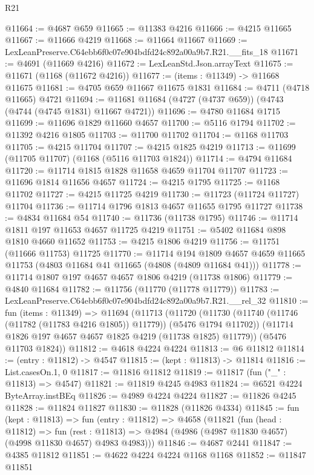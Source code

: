 \begin{lexlean}{R21}
\begin{coremodule}
@11664 := @4687 @659
@11665 := @11383 @4216
@11666 := @4215 @11665
@11667 := @11666 @4219
@11668 := @11664 @11667
@11669 := LexLeanPreserve.C64ebb6f0c07e904bdfd24c892a00a9b7.R21.__fits_18
@11671 := @4691 (@11669 @4216)
@11672 := LexLeanStd.Json.arrayText
@11675 := @11671 (@1168 (@11672 @4216))
@11677 := (items : @11349) -> @11668 @11675
@11681 := @4705 @659 @11667 @11675 @1831
@11684 := @4711 (@4718 @11665) @4721
@11694 := @11681 @11684 (@4727 (@4737 @659)) (@4743 (@4744 (@4745 @1831) @11667 @4721))
@11696 := @4780 @11684 @1715
@11699 := @11696 @1829 @11660 @4657
@11700 := @5116 @1794
@11702 := @11392 @4216 @1805
@11703 := @11700 @11702
@11704 := @1168 @11703
@11705 := @4215 @11704
@11707 := @4215 @1825 @4219
@11713 := @11699 (@11705 @11707) (@1168 (@5116 @11703 @1824))
@11714 := @4794 @11684
@11720 := @11714 @1815 @1828 @11658 @4659 @11704 @11707
@11723 := @11696 @1814 @11656 @4657
@11724 := @4215 @1795
@11725 := @1168 @11702
@11727 := @4215 @11725 @4219
@11730 := @11723 (@11724 @11727) @11704
@11736 := @11714 @1796 @1813 @4657 @11655 @1795 @11727
@11738 := @4834 @11684 @54
@11740 := @11736 (@11738 @1795)
@11746 := @11714 @1811 @197 @11653 @4657 @11725 @4219
@11751 := @5402 @11684 @898 @1810 @4660 @11652
@11753 := @4215 @1806 @4219
@11756 := @11751 (@11666 @11753) @11725
@11770 := @11714
    @194
    @1809
    @4657
    @4659
    @11665
    @11753
    (@4803 @11684 @41 @11665 (@4808 (@4809 @11684 @41)))
@11778 := @11714 @1807 @197 @4657 @4657 @1806 @4219 (@11738 @1806)
@11779 := @4840 @11684
@11782 := @11756 (@11770 (@11778 @11779))
@11783 := LexLeanPreserve.C64ebb6f0c07e904bdfd24c892a00a9b7.R21.__rel_32
@11810 := fun (items : @11349) =>
  @11694
    (@11713
      (@11720
        (@11730 (@11740 (@11746 (@11782 (@11783 @4216 @1805)) @11779)) (@5476 @1794 @11702))
        (@11714 @1826 @197 @4657 @4657 @1825 @4219 (@11738 @1825) @11779))
      (@5476 @11703 @1824))
@11812 := @4618 @4224 @4224
@11813 := @6 @11812
@11814 := (entry : @11812) -> @4547
@11815 := (kept : @11813) -> @11814
@11816 := List.casesOn.{1, 0}
@11817 := @11816 @11812
@11819 := @11817 (fun ("_" : @11813) => @4547)
@11821 := @11819 @4245 @4983
@11824 := @6521 @4224 ByteArray.instBEq
@11826 := @4989 @4224 @4224
@11827 := @11826 @4245
@11828 := @11824 @11827
@11830 := @11828 (@11826 @4334)
@11845 := fun (kept : @11813) =>
  fun (entry : @11812) =>
  @4658
    (@11821
      (fun (head : @11812) =>
      fun (rest : @11813) => @4984 (@4986 (@4987 @11830 @4657) (@4998 @11830 @4657) @4983 @4983)))
@11846 := @4687 @2441
@11847 := @4385 @11812
@11851 := @4622 @4224 @4224 @1168 @1168
@11852 := @11847 @11851

\end{coremodule}
\end{lexlean}
